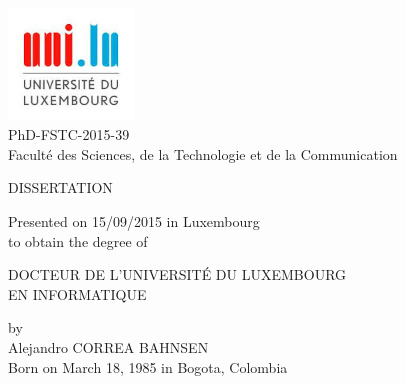 
\begin{titlepage}
	\begin{addmargin}[-1cm]{-1cm}
    \begin{center}
        \includegraphics[width=0.25\textwidth]{figures/logo_unilu}\\
        \large
        PhD-FSTC-2015-39\\
        Facult\'{e} des Sciences, de la Technologie et de la Communication \\ \vskip1.5cm

				{\Large \textsc{DISSERTATION}} \\ \vskip1cm

        Presented on 15/09/2015 in Luxembourg\\ \vskip0.25cm
        to obtain the degree of \\ \vskip1cm
        
        {\Large \textsc{DOCTEUR DE L'UNIVERSIT\'{E} DU LUXEMBOURG}}\\ \vskip0.5cm
        {\Large \textsc{EN INFORMATIQUE}}\\ \vskip0.5cm
        
        by \\ \vskip0.5cm
        Alejandro CORREA BAHNSEN \\
        {\small Born on March 18, 1985 in Bogota, Colombia} \\ \vskip2cm
        
        \begingroup
            \Large
             \\ 
						\bigskip
        \endgroup
        \\
        \bigskip
        \vfill
    \end{center}
  \end{addmargin}
\end{titlepage}
